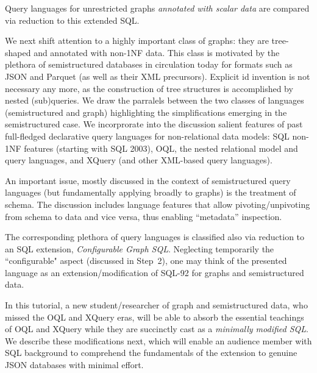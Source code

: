 Query languages for unrestricted graphs {\em annotated with scalar data} are compared via reduction to this extended SQL.

We next shift attention to a highly important class of graphs: they are tree-shaped and annotated with non-1NF data.
This class is motivated by the plethora of semistructured databases in circulation today for formats such as JSON and Parquet (as well as their XML precursors). Explicit id invention is not necessary any more, as the construction of tree structures is accomplished by nested (sub)queries. We draw the parralels between the two classes of languages (semistructured and graph) highlighting the simplifications emerging in the semistructured case. We incorprorate into the discussion salient features of past full-fledged declarative query languages for non-relational data models: SQL non-1NF features (starting with SQL 2003), OQL,
the nested relational model and query languages,
and XQuery (and other XML-based query languages).

An important issue, mostly discussed in the context of semistructured query languages (but fundamentally applying broadly to graphs) is the treatment of schema. The discussion includes language features that allow pivoting/unpivoting from schema to data and vice versa, thus enabling ``metadata'' inspection.

The corresponding plethora of query languages is classified also via reduction to an SQL extension, \emph{Configurable Graph SQL}.
Neglecting temporarily the ``configurable" aspect (discussed in Step~2), one may think of the presented language as an extension/modification of SQL-92 for graphs and semistructured data.

In this tutorial, a new student/researcher of graph and semistructured data, who missed the OQL and XQuery eras, will be able to absorb the essential teachings of OQL and XQuery while they are succinctly cast as a {\em minimally modified SQL}. We describe these modifications next, which will enable an audience member with SQL background to comprehend the fundamentals of the extension to genuine JSON databases with minimal effort.

